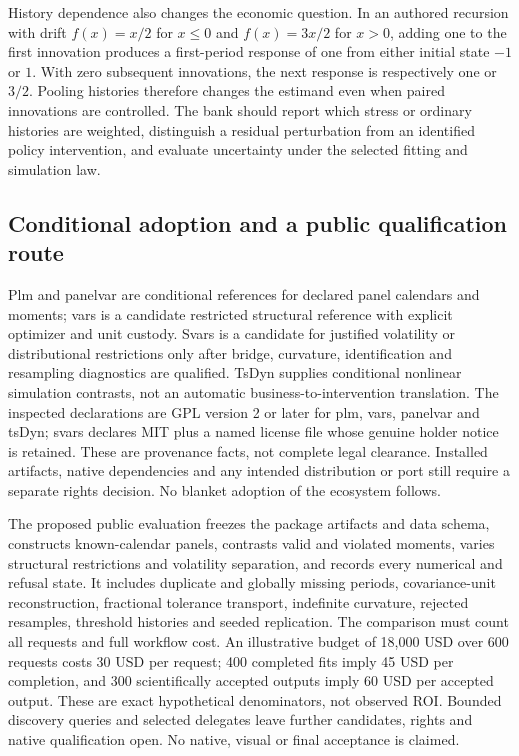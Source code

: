 History dependence also changes the economic question. In an authored recursion with drift $f(x)=x/2$ for $x\leq0$ and $f(x)=3x/2$ for $x>0$, adding one to the first innovation produces a first-period response of one from either initial state $-1$ or $1$. With zero subsequent innovations, the next response is respectively one or $3/2$. Pooling histories therefore changes the estimand even when paired innovations are controlled. The bank should report which stress or ordinary histories are weighted, distinguish a residual perturbation from an identified policy intervention, and evaluate uncertainty under the selected fitting and simulation law.\citep{exec25_rdyn_choice}

\subsection{Conditional adoption and a public qualification route}

Plm and panelvar are conditional references for declared panel calendars and moments; vars is a candidate restricted structural reference with explicit optimizer and unit custody. Svars is a candidate for justified volatility or distributional restrictions only after bridge, curvature, identification and resampling diagnostics are qualified. TsDyn supplies conditional nonlinear simulation contrasts, not an automatic business-to-intervention translation. The inspected declarations are GPL version 2 or later for plm, vars, panelvar and tsDyn; svars declares MIT plus a named license file whose genuine holder notice is retained. These are provenance facts, not complete legal clearance. Installed artifacts, native dependencies and any intended distribution or port still require a separate rights decision. No blanket adoption of the ecosystem follows.\citep{exec25_rdyn_plm,exec25_rdyn_vars,exec25_rdyn_svars,exec25_rdyn_panelvar,exec25_rdyn_tsdyn}

The proposed public evaluation freezes the package artifacts and data schema, constructs known-calendar panels, contrasts valid and violated moments, varies structural restrictions and volatility separation, and records every numerical and refusal state. It includes duplicate and globally missing periods, covariance-unit reconstruction, fractional tolerance transport, indefinite curvature, rejected resamples, threshold histories and seeded replication. The comparison must count all requests and full workflow cost. An illustrative budget of 18,000 USD over 600 requests costs 30 USD per request; 400 completed fits imply 45 USD per completion, and 300 scientifically accepted outputs imply 60 USD per accepted output. These are exact hypothetical denominators, not observed ROI. Bounded discovery queries and selected delegates leave further candidates, rights and native qualification open. No native, visual or final acceptance is claimed.\citep{exec25_rdyn_choice}
